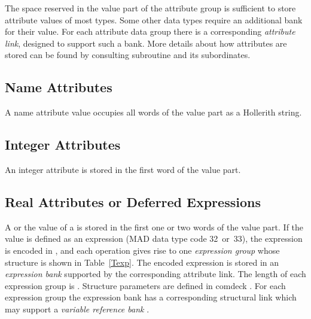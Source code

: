 The space reserved in the value part of the attribute group
is sufficient to store attribute values of most types.
Some other data types require an additional bank for their value.
For each attribute data group there is a corresponding
{\em attribute link},
designed to support such a bank.
More details about how attributes are stored can be found
by consulting subroutine  and its subordinates.
 
\subsection{Name Attributes}
A name attribute value occupies all  words
of the value part as a Hollerith string.
 
\subsection{Integer Attributes}
An integer attribute is stored in the first word
of the value part.
 
\subsection{Real Attributes or Deferred Expressions}
\label{Sexp}
A  or the value of a
 is stored in the first one or two words
of the value part.
If the value is defined as an expression
(MAD data type code 32~or~33),
the expression is encoded in ,
and each operation gives rise to one {\em expression group}
 whose structure is shown in Table~\ref{Texp}.
The encoded expression is stored in an {\em expression bank}
 supported by the corresponding attribute link.
The length of each expression group is .
Structure parameters are defined in comdeck .
For each expression group the expression bank has a corresponding
structural link which may support a {\em variable reference bank}
.
 
